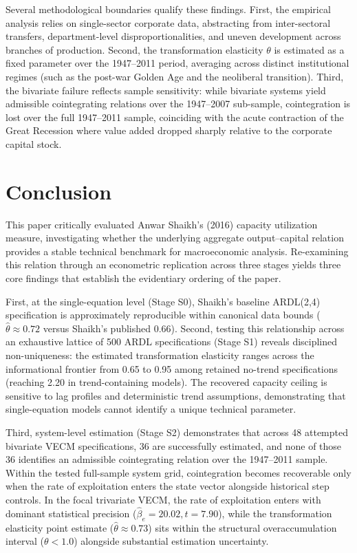 Several methodological boundaries qualify these findings. First, the empirical analysis relies on single-sector corporate data, abstracting from inter-sectoral transfers, department-level disproportionalities, and uneven development across branches of production. Second, the transformation elasticity $\theta$ is estimated as a fixed parameter over the 1947--2011 period, averaging across distinct institutional regimes (such as the post-war Golden Age and the neoliberal transition). Third, the bivariate failure reflects sample sensitivity: while bivariate systems yield admissible cointegrating relations over the 1947--2007 sub-sample, cointegration is lost over the full 1947--2011 sample, coinciding with the acute contraction of the Great Recession where value added dropped sharply relative to the corporate capital stock.

\section{Conclusion}
\label{sec:conclusion}

This paper critically evaluated Anwar Shaikh's (2016) capacity utilization measure, investigating whether the underlying aggregate output--capital relation provides a stable technical benchmark for macroeconomic analysis. Re-examining this relation through an econometric replication across three stages yields three core findings that establish the evidentiary ordering of the paper.

First, at the single-equation level (Stage S0), Shaikh's baseline ARDL(2,4) specification is approximately reproducible within canonical data bounds ($\hat{\theta} \approx 0.72$ versus Shaikh's published 0.66). Second, testing this relationship across an exhaustive lattice of 500 ARDL specifications (Stage S1) reveals disciplined non-uniqueness: the estimated transformation elasticity ranges across the informational frontier from 0.65 to 0.95 among retained no-trend specifications (reaching 2.20 in trend-containing models). The recovered capacity ceiling is sensitive to lag profiles and deterministic trend assumptions, demonstrating that single-equation models cannot identify a unique technical parameter.

Third, system-level estimation (Stage S2) demonstrates that across 48 attempted bivariate VECM specifications, 36 are successfully estimated, and none of those 36 identifies an admissible cointegrating relation over the 1947--2011 sample. Within the tested full-sample system grid, cointegration becomes recoverable only when the rate of exploitation enters the state vector alongside historical step controls. In the focal trivariate VECM, the rate of exploitation enters with dominant statistical precision ($\hat{\beta}_e = 20.02, t = 7.90$), while the transformation elasticity point estimate ($\hat{\theta} \approx 0.73$) sits within the structural overaccumulation interval ($\theta < 1.0$) alongside substantial estimation uncertainty.

